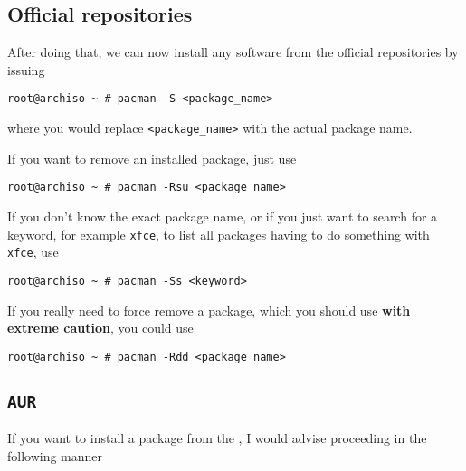 \documentclass[10pt]{dustdoc}
\begin{document}
\subsection{Official repositories}
\label{sec:official-repositories}

After doing that, we can now install any software from the official repositories by issuing

\begin{verbatim}
root@archiso ~ # pacman -S <package_name>
\end{verbatim}

\noindent
where you would replace \texttt{<package\_name>} with the actual package name.

If you want to remove an installed package, just use

\begin{verbatim}
root@archiso ~ # pacman -Rsu <package_name>
\end{verbatim}

If you don’t know the exact package name, or if you just want to search for a keyword, for example \texttt{xfce}, to list all packages having to do something with \texttt{xfce}, use

\begin{verbatim}
root@archiso ~ # pacman -Ss <keyword>
\end{verbatim}

\begin{CAUTION}
    If you really need to force remove a package, which you should use \textbf{with extreme caution}, you could use

    \begin{verbatim}
root@archiso ~ # pacman -Rdd <package_name>
    \end{verbatim}
\end{CAUTION}

\subsection{\texttt{AUR}}
\label{sec:aur}

If you want to install a package from the , I would advise proceeding in the following manner
\end{document}
